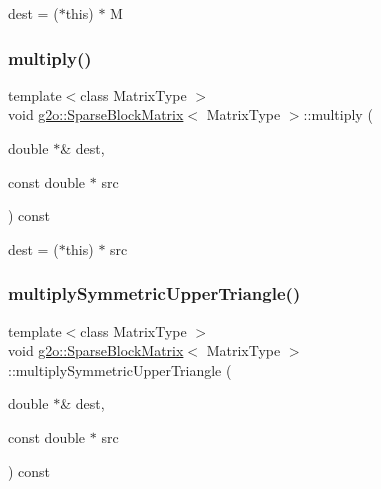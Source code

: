 dest = ($\ast$this) $\ast$ M 

\mbox{\label{classg2o_1_1_sparse_block_matrix_ae71075d1c8e421389316712d12ba1598}} 
\subsubsection{\texorpdfstring{multiply()}{multiply()}\hspace{0.1cm}{\footnotesize\ttfamily [2/2]}}
{\footnotesize\ttfamily template$<$class Matrix\+Type $>$ \\
void \mbox{\hyperlink{classg2o_1_1_sparse_block_matrix}{g2o\+::\+Sparse\+Block\+Matrix}}$<$ Matrix\+Type $>$\+::multiply (\begin{DoxyParamCaption}\item[{double $\ast$\&}]{dest,  }\item[{const double $\ast$}]{src }\end{DoxyParamCaption}) const}



dest = ($\ast$this) $\ast$ src 

\mbox{\label{classg2o_1_1_sparse_block_matrix_a87a57d96e63668c7131dee642c25ac5f}} 
\subsubsection{\texorpdfstring{multiply\+Symmetric\+Upper\+Triangle()}{multiplySymmetricUpperTriangle()}}
{\footnotesize\ttfamily template$<$class Matrix\+Type $>$ \\
void \mbox{\hyperlink{classg2o_1_1_sparse_block_matrix}{g2o\+::\+Sparse\+Block\+Matrix}}$<$ Matrix\+Type $>$\+::multiply\+Symmetric\+Upper\+Triangle (\begin{DoxyParamCaption}\item[{double $\ast$\&}]{dest,  }\item[{const double $\ast$}]{src }\end{DoxyParamCaption}) const}

